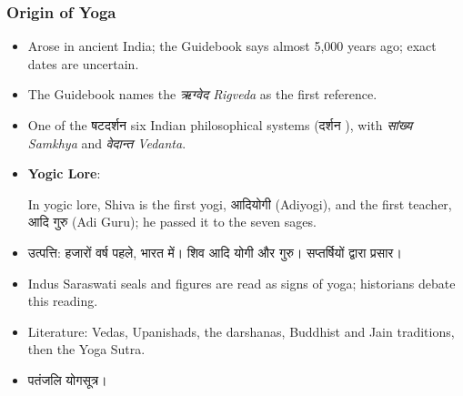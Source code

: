 \begin{frame}[fragile]\frametitle{Origin of Yoga}

      \begin{itemize}
		\item Arose in ancient India; the Guidebook says almost 5,000 years ago; exact dates are uncertain.
		\item The Guidebook names the \textit{ऋग्वेद  Rigveda} as the first reference.
		\item One of the षटदर्शन  six Indian philosophical systems (दर्शन ), with \textit{सांख्य  Samkhya} and \textit{वेदान्त  Vedanta}.
          
          
          
          
        \item \textbf{Yogic Lore}: 
          
          In yogic lore, Shiva is the first yogi, आदियोगी (Adiyogi), and the first teacher, आदि गुरु (Adi Guru); he passed it to the seven sages.
          		
		\item उत्पत्ति: हजारों वर्ष पहले, भारत में। शिव आदि योगी और गुरु। सप्तर्षियों द्वारा प्रसार।
		\item Indus Saraswati seals and figures are read as signs of yoga; historians debate this reading.
		\item Literature: Vedas, Upanishads, the darshanas, Buddhist and Jain traditions, then the Yoga Sutra.
		\item  पतंजलि योगसूत्र।
	  \end{itemize}


\end{frame}

